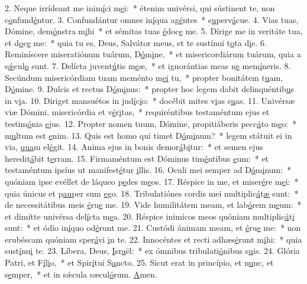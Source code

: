 2. Neque irrídeant me inim\uline{í}ci m\uline{e}i:~* étenim univérsi, qui sústinent te, non c\uline{o}nfund\uline{é}ntur.
3. Confundántur omnes in\uline{í}qua ag\uline{é}ntes~* s\uline{u}perv\uline{á}cue.
4. Vias tuas, Dómine, dem\uline{ó}nstra m\uline{i}hi~* et sémitas tuas \uline{é}doc\uline{e} me.
5. Dírige me in veritáte tua, et d\uline{o}c\uline{e} me:~* quia tu es, Deus, Salvátor meus, et te sustínui t\uline{o}ta d\uline{i}e.
6. Reminíscere miseratiónum tuárum, D\uline{ó}m\uline{i}ne,~* et misericordiárum tuárum, quia a s\uline{ǽ}cul\uline{o} sunt.
7. Delícta juvent\uline{ú}tis m\uline{e}æ,~* et ignorántias meas n\uline{e} mem\uline{í}neris.
8. Secúndum misericórdiam tuam meménto m\uline{e}\uline{i} tu,~* propter bonitátem t\uline{u}am, D\uline{ó}mine.
9. Dulcis et rectus D\uline{ó}m\uline{i}nus:~* propter hoc legem dabit delinquéntib\uline{u}s in v\uline{i}a.
10. Díriget mansuétos in jud\uline{í}c\uline{i}o:~* docébit mites v\uline{i}as s\uline{u}as.
11. Univérsæ viæ Dómini, misericórdia et v\uline{é}r\uline{i}tas,~* requiréntibus testaméntum ejus et testim\uline{ó}nia \uline{e}jus.
12. Propter nomen tuum, Dómine, propitiáberis pecc\uline{á}to m\uline{e}o:~* m\uline{u}ltum est \uline{e}nim.
13. Quis est homo qui timet D\uline{ó}m\uline{i}num?~* legem státuit ei in via, \uline{qua}m el\uline{é}git.
14. Anima ejus in bonis demor\uline{á}b\uline{i}tur:~* et semen ejus heredit\uline{á}bit t\uline{e}rram.
15. Firmaméntum est Dóminus tim\uline{é}ntibus \uline{e}um:~* et testaméntum ipsíus ut manifest\uline{é}tur \uline{i}llis.
16. Oculi mei semper ad D\uline{ó}m\uline{i}num:~* quóniam ipse evéllet de láqueo p\uline{e}des m\uline{e}os.
17. Réspice in me, et miser\uline{é}re m\uline{e}i:~* quia únicus et p\uline{au}per sum \uline{e}go.
18. Tribulatiónes cordis mei multiplic\uline{á}t\uline{æ} sunt:~* de necessitátibus meis \uline{é}ru\uline{e} me.
19. Vide humilitátem meam, et lab\uline{ó}rem m\uline{e}um:~* et dimítte univérsa del\uline{í}cta m\uline{e}a.
20. Réspice inimícos meos quóniam multiplic\uline{á}t\uline{i} sunt:~* et ódio in\uline{í}quo od\uline{é}runt me.
21. Custódi ánimam meam, et \uline{é}ru\uline{e} me:~* non erubéscam quóniam sper\uline{á}vi \uline{i}n te.
22. Innocéntes et recti adhæs\uline{é}runt m\uline{i}hi:~* quia sust\uline{í}nu\uline{i} te.
23. Líbera, Deus, \uline{I}sr\uline{a}ël:~* ex ómnibus tribulati\uline{ó}nibus s\uline{u}is.
24. Glória Patri, et F\uline{í}l\uline{i}o,~* et Spir\uline{í}tui S\uline{a}ncto.
25. Sicut erat in princípio, et n\uline{u}nc, et s\uline{e}mper,~* et in sǽcula sæcul\uline{ó}rum. \uline{A}men.
